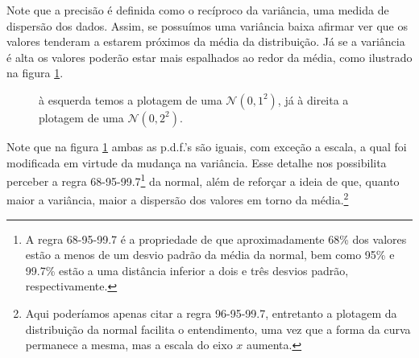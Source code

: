 \documentclass{article}
\begin{document}
	Note que a precisão é definida como o recíproco da variância, uma medida de dispersão dos dados. Assim, se possuímos uma variância baixa afirmar ver que os valores tenderam a estarem próximos da média da distribuição. Já se a variância é alta os valores poderão estar mais espalhados ao redor da média, como ilustrado na figura \ref{gaussianas}.
	\begin{figure}[H]
		\caption{à esquerda temos a plotagem de uma $\mathcal{N}(0, 1^2)$, já à direita a plotagem de uma $\mathcal{N}(0, 2^2)$.}
		\label{gaussianas}
	\end{figure}
	
	Note que na figura \ref{gaussianas} ambas as p.d.f.'s são iguais, com exceção a escala, a qual foi modificada em virtude da mudança na variância. Esse detalhe nos possibilita perceber a regra 68-95-99.7\footnote{A regra 68-95-99.7 é a propriedade de que aproximadamente 68\% dos valores estão a menos de um desvio padrão da média da normal, bem como 95\% e 99.7\% estão a uma distância inferior a dois e três desvios padrão, respectivamente.} da normal, além de reforçar a ideia de que, quanto maior a variância, maior a dispersão dos valores em torno da média.\footnote{Aqui poderíamos apenas citar a regra 96-95-99.7, entretanto a plotagem da distribuição da normal facilita o entendimento, uma vez que a forma da curva permanece a mesma, mas a escala do eixo $x$ aumenta.}
	
\end{document}
